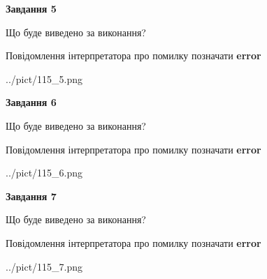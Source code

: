 \documentclass[10pt, ukrainian]{article}
\begin{document}
{\begin {large}
{\begin {center}\textbf{Завдання 5}\end {center}}\par
Що буде виведено за виконання? \par
Повідомлення інтерпретатора про помилку позначати \textbf{error}

\begin{center}
	{../pict/115_5.png}
\end{center}
\newpage

{\begin {center}\textbf{Завдання 6}\end {center}}\par
Що буде виведено за виконання? \par
Повідомлення інтерпретатора про помилку позначати \textbf{error}

\begin{center}
	{../pict/115_6.png}
\end{center}
\newpage

{\begin {center}\textbf{Завдання 7}\end {center}}\par
Що буде виведено за виконання? \par
Повідомлення інтерпретатора про помилку позначати \textbf{error}

\begin{center}
	{../pict/115_7.png}
\end{center}
\newpage

\end {large}}
\end{document}
